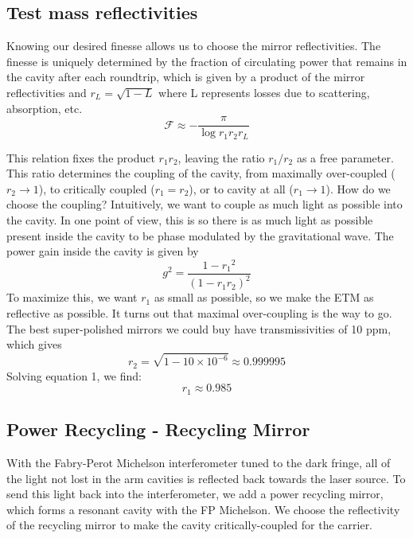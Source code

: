 \subsection*{Test mass reflectivities}

Knowing our desired finesse allows us to choose the mirror reflectivities.
The finesse is uniquely determined by the fraction of circulating
power that remains in the cavity after each roundtrip, which is given
by a product of the mirror reflectivities and $r_{L}=\sqrt{1-L}$
where L represents losses due to scattering, absorption, etc. 
\begin{equation}
\mathcal{F}\approx-\frac{\pi}{\log r_{1}r_{2}r_{L}}
\end{equation}

This relation fixes the product $r_{1}r_{2}$, leaving the ratio $r_{1}/r_{2}$
as a free parameter. This ratio determines the coupling of the cavity,
from maximally over-coupled ($r_{2}\rightarrow1$), to critically
coupled ($r_{1}=r_{2}$), or to cavity at all ($r_{1}\rightarrow1$).
How do we choose the coupling? Intuitively, we want to couple as much
light as possible into the cavity. In one point of view, this is so
there is as much light as possible present inside the cavity to be
phase modulated by the gravitational wave. The power gain inside the
cavity is given by
\[
g^{2}=\frac{1-r_{1}{}^{2}}{\left(1-r_{1}r_{2}\right)^{2}}
\]
To maximize this, we want $r_{1}$ as small as possible, so we make
the ETM as reflective as possible. It turns out that maximal over-coupling
is the way to go. The best super-polished mirrors we could buy have
transmissivities of 10 ppm, which gives
\begin{equation}
r_{2}=\sqrt{{1-10\times10^{-6}}}\approx0.999995
\end{equation}
Solving equation 1, we find:
\begin{equation}
r_{1}\approx0.985
\end{equation}

\subsection*{Power Recycling - Recycling Mirror}

With the Fabry-Perot Michelson interferometer tuned to the dark fringe, all
of the light not lost in the arm cavities is reflected back towards
the laser source. To send this light back into the interferometer,
we add a power recycling mirror, which forms a resonant cavity with
the FP Michelson. We choose the reflectivity of the recycling mirror
to make the cavity critically-coupled for the carrier. 

